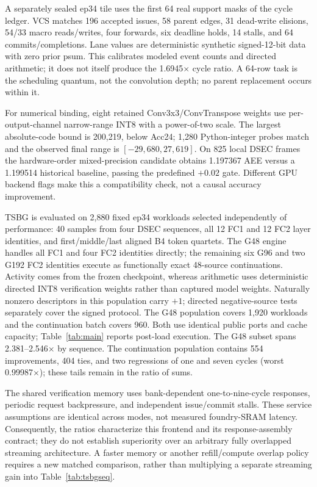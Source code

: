 \documentclass[journal]{IEEEtran}
\begin{document}
A separately sealed ep34 tile uses the first 64 real support masks of the
cycle ledger.  VCS matches 196 accepted issues, 58 parent edges, 31
dead-write elisions, 54/33 macro reads/writes, four forwards, six deadline
holds, 14 stalls, and 64 commits/completions.  Lane values are deterministic
synthetic signed-12-bit data with zero prior psum.  This calibrates modeled
event counts and directed arithmetic; it does not itself produce the
1.6945$\times$ cycle ratio.  A 64-row task is the scheduling quantum, not the
convolution depth; no parent replacement occurs within it.

For numerical binding, eight retained Conv3x3/ConvTranspose weights use
per-output-channel narrow-range INT8 with a power-of-two scale.  The largest
absolute-code bound is 200{,}219, below Acc24; 1{,}280 Python-integer probes
match and the observed final range is $[-29{,}680,27{,}619]$.  On 825 local
DSEC frames the hardware-order mixed-precision candidate obtains 1.197367 AEE
versus a 1.199514 historical baseline, passing the predefined $+0.02$ gate.
Different GPU backend flags make this a compatibility check, not a causal
accuracy improvement.

TSBG is evaluated on 2,880 fixed ep34 workloads selected independently of
performance: 40 samples from four DSEC sequences, all 12 FC1 and 12 FC2 layer
identities, and first/middle/last aligned B4 token quartets.  The G48 engine
handles all FC1 and four FC2 identities directly; the remaining six G96 and
two G192 FC2 identities execute as functionally exact 48-source continuations.  Activity
comes from the frozen checkpoint, whereas arithmetic uses
deterministic directed INT8 verification weights rather than captured model
weights.  Naturally nonzero descriptors in this population carry $+1$;
directed negative-source tests separately cover the signed protocol.  The
G48 population covers 1,920 workloads and the continuation batch covers 960.
Both use identical public ports and cache capacity;
Table~\ref{tab:main} reports post-load execution.  The G48
subset spans 2.381--2.546$\times$ by sequence.  The continuation population
contains 554 improvements, 404 ties, and two regressions of one and seven
cycles (worst 0.99987$\times$); these tails remain in the ratio of sums.

The shared verification memory uses bank-dependent one-to-nine-cycle
responses, periodic request backpressure, and independent issue/commit
stalls.  These service assumptions are identical across modes, not measured
foundry-SRAM latency.  Consequently, the ratios characterize this frontend
and its response-assembly contract; they do not establish superiority over
an arbitrary fully overlapped streaming architecture.  A faster memory or
another refill/compute overlap policy requires a new matched comparison,
rather than multiplying a separate streaming gain into Table~\ref{tab:tsbgseq}.
\end{document}

